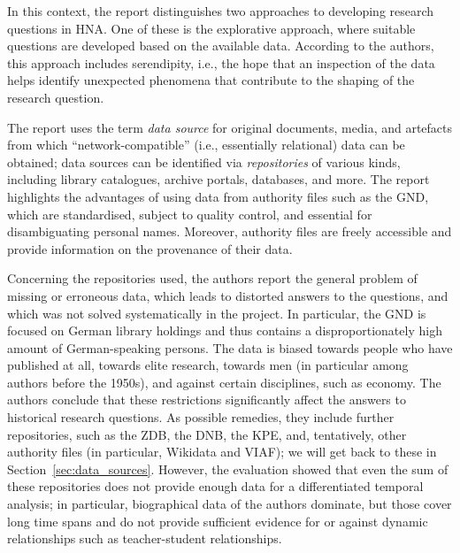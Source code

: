 In this context, the report distinguishes two approaches to developing research questions
in \gls{HNA}. One of these is the explorative approach,
where suitable questions are developed based on the available data.
According to the authors, this approach includes serendipity,
i.e., the hope that an inspection of the data helps identify unexpected
phenomena that contribute to the shaping of the research question.

The report uses the term \emph{data source} for original documents, media, and artefacts
from which \enquote{network-compatible} (i.e., essentially relational) data can be obtained;
data sources can be identified via \emph{repositories} of various kinds,
including library catalogues, archive portals, databases, and more.
The report highlights the advantages of using data from authority files
such as the \gls{GND}, which are standardised,
subject to quality control, and essential for disambiguating personal names.
Moreover, authority files are freely accessible and provide information
on the provenance of their data.

Concerning the repositories used,
the authors report the general problem of missing or erroneous data,
which leads to distorted answers to the questions, and which was not solved
systematically in the project. In particular, the \gls{GND} is focused on German library holdings
and thus contains a disproportionately high amount of German-speaking persons.
The data is biased towards people who have published at all,
towards elite research, towards men (in particular among authors before the 1950s),
and against certain disciplines, such as economy.
The authors conclude that these restrictions significantly affect the answers to
historical research questions. As possible remedies, they include 
further repositories, such as 
the \gls{ZDB},
the \gls{DNB},
the \gls{KPE},
and, tentatively, other authority files (in particular, Wikidata and \gls{VIAF});
we will get back to these in Section~\ref{sec:data_sources}.
However, the evaluation showed that even the sum of these repositories
does not provide enough data for a differentiated temporal
analysis; in particular, biographical data of the authors 
dominate, but those cover long time spans and do not provide sufficient evidence
for or against dynamic relationships such as teacher-student relationships.

